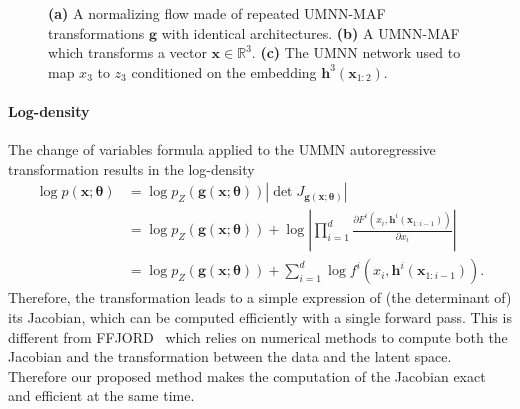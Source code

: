 \begin{figure}
\caption{\textbf{(a)} A normalizing flow made of repeated UMNN-MAF transformations $\mathbf{g}$ with identical architectures. \textbf{(b)} A UMNN-MAF which transforms a vector $\mathbf{x}\in \mathbb{R}^3$. \textbf{(c)} The UMNN network used to map $x_3$ to $z_3$ conditioned on the embedding $\mathbf{h}^3(\mathbf{x}_{1:2})$.}
\label{fig:architecture}
\end{figure}
\vspace{-1em}



\paragraph{Log-density}
The change of variables formula applied to the UMMN autoregressive transformation results in the log-density
\begin{align}
    \log p(\mathbf{x}; \mathbf{\theta}) &= \log p_Z(\mathbf{g}(\mathbf{x}; \mathbf{\theta}))  \left|\det J_{\mathbf{g}(\mathbf{x};\mathbf{\theta})} \right|  \nonumber\\
    &=\log p_Z(\mathbf{g}(\mathbf{x}; \mathbf{\theta}))  + \log\left|\prod^d_{i=1} \frac{\partial F^i(x_i, \mathbf{h}^i(\mathbf{x}_{1 : i-1}))}{\partial x_i}\right| \nonumber\\
    &=\log p_Z(\mathbf{g}(\mathbf{x}; \mathbf{\theta}))   + \sum^d_{i=1} \log f^i(x_i, \mathbf{h}^i(\mathbf{x}_{1 : i-1})).
\end{align}
Therefore, the transformation leads to a simple expression of (the determinant of) its Jacobian, which can be  computed efficiently with a single forward pass. This is different from FFJORD~\citep{grathwohl_ffjord_2018} which relies on numerical methods to compute both the Jacobian and the transformation between the data and the latent space. Therefore our proposed method makes the computation of the Jacobian exact and efficient at the same time.

